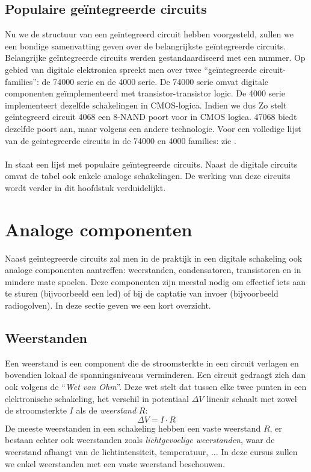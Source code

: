 \subsection{Populaire ge\"integreerde circuits}
Nu we de structuur van een ge\"integreerd circuit hebben voorgesteld, zullen we een bondige samenvatting geven over de belangrijkste ge\"integreerde circuits. Belangrijke ge\"integreerde circuits werden gestandaardiseerd met een nummer. Op gebied van digitale elektronica spreekt men over twee ``ge\"integreerde circuit-families'': de 74000 serie en de 4000 serie. De 74000 serie omvat digitale componenten ge\"implementeerd met transistor-transistor logic. De 4000 serie implementeert dezelfde schakelingen in CMOS-logica. Indien we dus Zo stelt ge\"integreerd circuit 4068 een 8-NAND poort voor in CMOS logica. 47068 biedt dezelfde poort aan, maar volgens een andere technologie. Voor een volledige lijst van de ge\"integreerde circuits in de 74000 en 4000 families: zie \cite{74000icfamily,4000icfamily}.
\paragraph{}
In  staat een lijst met populaire ge\"integreerde circuits. Naast de digitale circuits omvat de tabel ook enkele analoge schakelingen. De werking van deze circuits wordt verder in dit hoofdstuk verduidelijkt.
\section{Analoge componenten}
Naast ge\"integreerde circuits zal men in de praktijk in een digitale schakeling ook analoge componenten aantreffen: weerstanden, condensatoren, transistoren en in mindere mate spoelen. Deze componenten zijn meestal nodig om effectief iets aan te sturen (bijvoorbeeld een led) of bij de captatie van invoer (bijvoorbeeld radiogolven). In deze sectie geven we een kort overzicht.
\subsection{Weerstanden}
Een weerstand is een component die de stroomsterkte in een circuit verlagen en bovendien lokaal de spanningsniveaus verminderen. Een circuit gedraagt zich dan ook volgens de ``\emph{Wet van Ohm}''. Deze wet stelt dat tussen elke twee punten in een elektronische schakeling, het verschil in potentiaal $\Delta V$ lineair schaalt met zowel de stroomsterkte $I$ als de \emph{weerstand} $R$:
\begin{equation}
\Delta V=I\cdot R
\end{equation}
De meeste weerstanden in een schakeling hebben een vaste weerstand $R$, er bestaan echter ook weerstanden zoals \emph{lichtgevoelige weerstanden}, waar de weerstand afhangt van de lichtintensiteit, temperatuur, ... In deze cursus zullen we enkel weerstanden met een vaste weerstand beschouwen.
